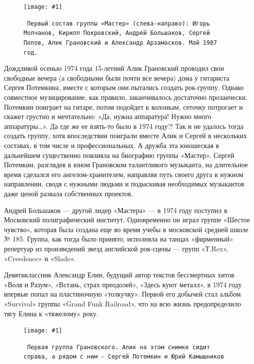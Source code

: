 \documentclass[16pt,a5paper]{book}
\newcommand{\myincludegraphics}[1]{\texttt{[image: \#1]}}
\begin{document}
\begin{figure}[h]
    \centering
    \myincludegraphics{Image01}
    \caption{\texttt{
        Первый состав группы «Мастер» (слева-направо): Игорь Молчанов, Кирилл Покровский, Андрей Большаков, Сергей
        Попов, Алик Грановский и Александр Арзамасков. Май 1987 год.
    }}
\end{figure}

Дождливой осенью 1974 года 15-летний Алик Грановский проводил свои свободные вечера (а свободными были почти все вечера)
дома у гитариста Сергея Потемкина, вместе с которым они пытались создать рок-группу. Однако совместное музицирование,
как правило, заканчивалось достаточно прозаически. Потемкин поиграет на гитаре, потом подойдет к колонкам, сеточку
потрогает и скажет грустно и мечтательно: «Да, нужна аппаратура! Нужно много аппаратуры\ldots». Да где же ее взять-то
было в 1974 году?! Так и не удалось тогда создать группу, хотя впоследствии поиграли вместе Алик и Сергей в нескольких
составах, в том числе и профессиональных. А дружба эта юношеская в дальнейшем существенно повлияла на биографию группы
«Мастер». Сергей Потемкин, разглядев в юном Грановском талантливого музыканта, на длительное время сделался его
ангелом-хранителем, направляя путь своего друга в нужном направлении, сводя с нужными людьми и подыскивая необходимых
музыкантов даже ценой развала собственных проектов.

Андрей Большаков — другой лидер «Мастера» — в 1974 году поступил в Московский полиграфический институт. Одновременно он
играл группе «Шестое чувство», которая была создана еще во время учебы в московской средней школе № 185. Группа, как
тогда было принято, исполняла на танцах «фирменный» репертуар из произведений звезд английской рок-сцены — групп
«Т.Rex», «Creedence» и «Slade».

Девятиклассник Александр Елин, будущий автор текстов бессмертных хитов «Воля и Разум», «Встань, страх преодолей»,
«Здесь куют металл», в 1974 году впервые попал на пластиночную «толкучку». Первой его добычей стал альбом «Survival»
группы «Grand Funk Railroad», что на всю жизнь предопределило тягу Елина к «тяжелому» року.

\begin{figure}
    \myincludegraphics{Image02}
    \caption{\texttt{
        Первая группа Грановского. Алик на этом снимке сидит справа, а рядом с ним - Сергей Потемкин и Юрий Камышников
    }}
\end{figure}
\end{document}
